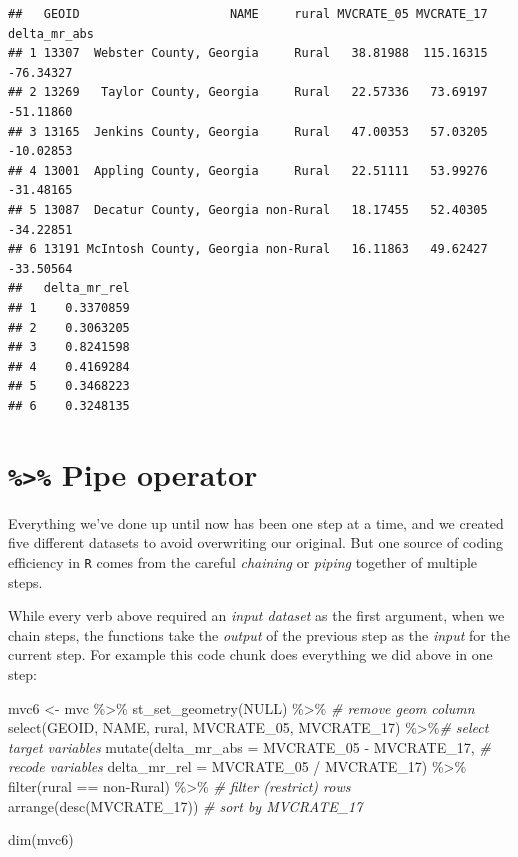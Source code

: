 \documentclass[
]{book}
\newenvironment{Shaded}{\begin{snugshade}}{\end{snugshade}}
\newcommand{\AttributeTok}[1]{\textcolor[rgb]{0.77,0.63,0.00}{#1}}
\newcommand{\CommentTok}[1]{\textcolor[rgb]{0.56,0.35,0.01}{\textit{#1}}}
\newcommand{\ConstantTok}[1]{\textcolor[rgb]{0.00,0.00,0.00}{#1}}
\newcommand{\FunctionTok}[1]{\textcolor[rgb]{0.00,0.00,0.00}{#1}}
\newcommand{\NormalTok}[1]{#1}
\newcommand{\OtherTok}[1]{\textcolor[rgb]{0.56,0.35,0.01}{#1}}
\newcommand{\SpecialCharTok}[1]{\textcolor[rgb]{0.00,0.00,0.00}{#1}}
\newcommand{\StringTok}[1]{\textcolor[rgb]{0.31,0.60,0.02}{#1}}
\begin{document}
\begin{verbatim}
##   GEOID                     NAME     rural MVCRATE_05 MVCRATE_17 delta_mr_abs
## 1 13307  Webster County, Georgia     Rural   38.81988  115.16315    -76.34327
## 2 13269   Taylor County, Georgia     Rural   22.57336   73.69197    -51.11860
## 3 13165  Jenkins County, Georgia     Rural   47.00353   57.03205    -10.02853
## 4 13001  Appling County, Georgia     Rural   22.51111   53.99276    -31.48165
## 5 13087  Decatur County, Georgia non-Rural   18.17455   52.40305    -34.22851
## 6 13191 McIntosh County, Georgia non-Rural   16.11863   49.62427    -33.50564
##   delta_mr_rel
## 1    0.3370859
## 2    0.3063205
## 3    0.8241598
## 4    0.4169284
## 5    0.3468223
## 6    0.3248135
\end{verbatim}

\hypertarget{pipe-operator}{%
\section{\texorpdfstring{\texttt{\%\textgreater{}\%} Pipe operator}{\%\textgreater\% Pipe operator}}\label{pipe-operator}}

Everything we've done up until now has been one step at a time, and we created five different datasets to avoid overwriting our original. But one source of coding efficiency in \texttt{R} comes from the careful \emph{chaining} or \emph{piping} together of multiple steps.

While every verb above required an \emph{input dataset} as the first argument, when we chain steps, the functions take the \emph{output} of the previous step as the \emph{input} for the current step. For example this code chunk does everything we did above in one step:

\begin{Shaded}
\begin{Highlighting}[]
\NormalTok{mvc6 }\OtherTok{\textless{}{-}}\NormalTok{ mvc }\SpecialCharTok{\%\textgreater{}\%}
  \FunctionTok{st\_set\_geometry}\NormalTok{(}\ConstantTok{NULL}\NormalTok{) }\SpecialCharTok{\%\textgreater{}\%}                             \CommentTok{\# remove geom column}
  \FunctionTok{select}\NormalTok{(GEOID, NAME, rural, MVCRATE\_05, MVCRATE\_17) }\SpecialCharTok{\%\textgreater{}\%}\CommentTok{\# select target variables}
  \FunctionTok{mutate}\NormalTok{(}\AttributeTok{delta\_mr\_abs =}\NormalTok{ MVCRATE\_05 }\SpecialCharTok{{-}}\NormalTok{ MVCRATE\_17,        }\CommentTok{\# recode variables}
        \AttributeTok{delta\_mr\_rel =}\NormalTok{ MVCRATE\_05 }\SpecialCharTok{/}\NormalTok{ MVCRATE\_17) }\SpecialCharTok{\%\textgreater{}\%}
  \FunctionTok{filter}\NormalTok{(rural }\SpecialCharTok{==} \StringTok{\textquotesingle{}non{-}Rural\textquotesingle{}}\NormalTok{) }\SpecialCharTok{\%\textgreater{}\%}                      \CommentTok{\# filter (restrict) rows}
  \FunctionTok{arrange}\NormalTok{(}\FunctionTok{desc}\NormalTok{(MVCRATE\_17))                             }\CommentTok{\# sort by MVCRATE\_17}

\FunctionTok{dim}\NormalTok{(mvc6)}
\end{Highlighting}
\end{Shaded}
\end{document}
